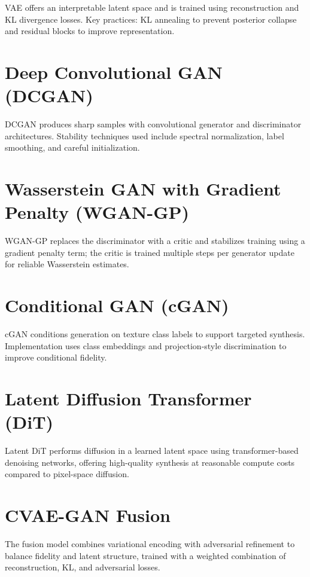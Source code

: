 \documentclass[12pt,a4paper]{report}
\begin{document}
VAE offers an interpretable latent space and is trained using reconstruction and KL divergence losses. Key practices: KL annealing to prevent posterior collapse and residual blocks to improve representation.

\section{Deep Convolutional GAN (DCGAN)}

DCGAN produces sharp samples with convolutional generator and discriminator architectures. Stability techniques used include spectral normalization, label smoothing, and careful initialization.

\section{Wasserstein GAN with Gradient Penalty (WGAN-GP)}

WGAN-GP replaces the discriminator with a critic and stabilizes training using a gradient penalty term; the critic is trained multiple steps per generator update for reliable Wasserstein estimates.

\section{Conditional GAN (cGAN)}

cGAN conditions generation on texture class labels to support targeted synthesis. Implementation uses class embeddings and projection-style discrimination to improve conditional fidelity.

\section{Latent Diffusion Transformer (DiT)}

Latent DiT performs diffusion in a learned latent space using transformer-based denoising networks, offering high-quality synthesis at reasonable compute costs compared to pixel-space diffusion.

\section{CVAE-GAN Fusion}

The fusion model combines variational encoding with adversarial refinement to balance fidelity and latent structure, trained with a weighted combination of reconstruction, KL, and adversarial losses.
\end{document}
